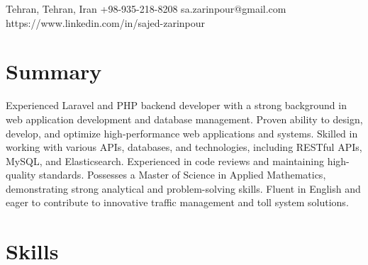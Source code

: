 \documentclass[10pt, a4paper]{article}
\begin{document}
	
	\contactInfo
	{Tehran, Tehran, Iran}
	{+98-935-218-8208}
	{sa.zarinpour@gmail.com}
	{https://www.linkedin.com/in/sajed-zarinpour}
	\section*{Summary}
	Experienced Laravel and PHP backend developer with a strong background in web application development and database management. Proven ability to design, develop, and optimize high-performance web applications and systems. Skilled in working with various APIs, databases, and technologies, including RESTful APIs, MySQL, and Elasticsearch. Experienced in code reviews and maintaining high-quality standards. Possesses a Master of Science in Applied Mathematics, demonstrating strong analytical and problem-solving skills. Fluent in English and eager to contribute to innovative traffic management and toll system solutions.
	
	\section*{Skills}

\end{document}

